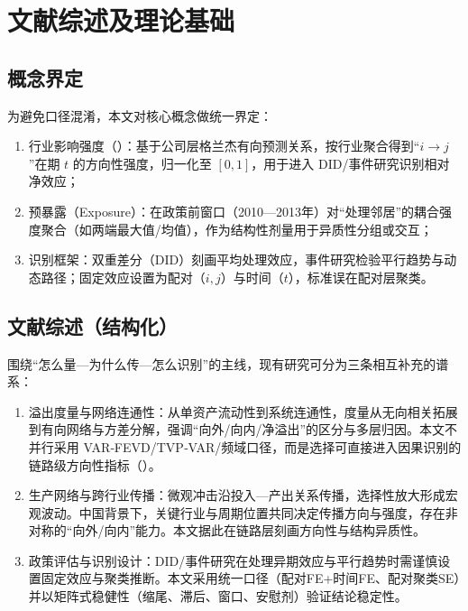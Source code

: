 \chapter{文献综述及理论基础}
\label{chap:literature}

\section{概念界定}
为避免口径混淆，本文对核心概念做统一界定：
\begin{enumerate}
  \item 行业影响强度（\II）：基于公司层格兰杰有向预测关系，按行业聚合得到“$i\to j$”在期 $t$ 的方向性强度，归一化至 $[0,1]$，用于进入 DID/事件研究识别相对净效应；
  \item 预暴露（Exposure）：在政策前窗口（2010—2013年）对“处理邻居”的耦合强度聚合（如两端最大值/均值），作为结构性剂量用于异质性分组或交互；
  \item 识别框架：双重差分（DID）刻画平均处理效应，事件研究检验平行趋势与动态路径；固定效应设置为配对（$i,j$）与时间（$t$），标准误在配对层聚类。
\end{enumerate}

\section{文献综述（结构化）}
围绕“怎么量—为什么传—怎么识别”的主线，现有研究可分为三条相互补充的谱系：
\begin{enumerate}
  \item 溢出度量与网络连通性：从单资产流动性到系统连通性，度量从无向相关拓展到有向网络与方差分解，强调“向外/向内/净溢出”的区分与多层归因\citep{billio2012econometric,diebold2012better,diebold2014connectedness}。本文不并行采用 VAR‑FEVD/TVP‑VAR/频域口径，而是选择可直接进入因果识别的链路级方向性指标（\II）。
  \item 生产网络与跨行业传播：微观冲击沿投入—产出关系传播，选择性放大形成宏观波动\citep{acemoglu2012network,carvalho2014micro}。中国背景下，关键行业与周期位置共同决定传播方向与强度，存在非对称的“向外/向内”能力。本文据此在链路层刻画方向性与结构异质性。
  \item 政策评估与识别设计：DID/事件研究在处理异期效应与平行趋势时需谨慎设置固定效应与聚类推断\citep{sun2021event,bertrand2004much,cameron2015practitioner,angrist2009mostly}。本文采用统一口径（配对FE+时间FE、配对聚类SE）并以矩阵式稳健性（缩尾、滞后、窗口、安慰剂）验证结论稳定性。
\end{enumerate}

